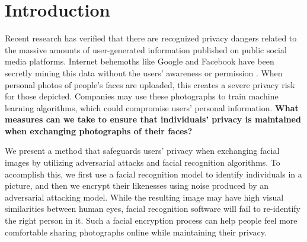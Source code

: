 \section{Introduction}

Recent research \cite{6227909} has verified that there are recognized privacy dangers related to the massive amounts of user-generated information published on public social media platforms. Internet behemoths like Google and Facebook have been secretly mining this data without the users' awareness or permission \cite{10.1093/idpl/ipw026}. When personal photos of people's faces are uploaded, this creates a severe privacy risk for those depicted. Companies may use these photographs to train machine learning algorithms, which could compromise users' personal information. \textbf{What measures can we take to ensure that individuals' privacy is maintained when exchanging photographs of their faces?}

We present a method that safeguards users' privacy when exchanging facial images by utilizing adversarial attacks and facial recognition algorithms. To accomplish this, we first use a facial recognition model to identify individuals in a picture, and then we encrypt their likenesses using noise produced by an adversarial attacking model. While the resulting image may have high visual similarities between human eyes, facial recognition software will fail to re-identify the right person in it. Such a facial encryption process can help people feel more comfortable sharing photographs online while maintaining their privacy.


